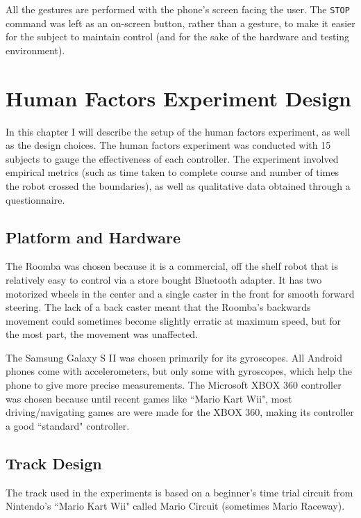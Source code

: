 \documentclass[12pt, letterpaper]{report}
\begin{document}
All the gestures are performed with the phone's screen facing the user. The \texttt{STOP} command was left as an on-screen button, rather than a gesture, to make it easier for the subject to maintain control (and for the sake of the hardware and testing environment).

\chapter{Human Factors Experiment Design}
In this chapter I will describe the setup of the human factors experiment, as well as the design choices. The human factors experiment was conducted with 15 subjects to gauge the effectiveness of each controller. The experiment involved empirical metrics (such as time taken to complete course and number of times the robot crossed the boundaries), as well as qualitative data obtained through a questionnaire.
\section{Platform and Hardware}
The Roomba was chosen because it is a commercial, off the shelf robot that is relatively easy to control via a store bought Bluetooth adapter. It has two motorized wheels in the center and a single caster in the front for smooth forward steering. The lack of a back caster meant that the Roomba's backwards movement could sometimes become slightly erratic at maximum speed, but for the most part, the movement was unaffected.

The Samsung Galaxy S II was chosen primarily for its gyroscopes. All Android phones come with accelerometers, but only some with gyroscopes, which help the phone to give more precise measurements. The Microsoft XBOX 360 controller was chosen because until recent games like ``Mario Kart Wii", most driving/navigating games are were made for the XBOX 360, making its controller a good ``standard" controller.
\section{Track Design}
The track used in the experiments is based on a beginner's time trial circuit from Nintendo's ``Mario Kart Wii" called Mario Circuit (sometimes Mario Raceway). 
\end{document}
